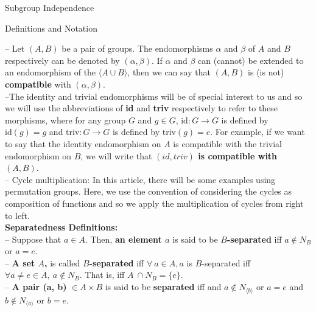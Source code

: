 \documentclass{article}
\begin{document}
\begin{section}{Subgroup Independence}
\begin{subsection}{\large Definitions and Notation}
			
			
			\noindent -- Let $(A, B)$ be a pair of groups. The endomorphisms $\alpha$ and $\beta$ of $A$ and $B$ respectively can be denoted by $(\alpha, \beta)$. If  $\alpha$ and $\beta$ can (cannot) be extended to an endomorphism of the $\langle A \cup B\rangle $, then we can say that $(A, B)$ is (is not) \textbf{compatible} with $(\alpha, \beta)$.\\
			
			\noindent --The identity and trivial endomorphisms will be of special interest to us and so we will use the abbreviations of \textbf{id} and\textbf{ triv} respectively to refer to these morphisms, where for any group $G$ and $g \in G$,  $\text{id}: G \rightarrow G$ is defined by $\text{id}(g) = g$ and $\text{triv}: G \rightarrow G$ is defined by $\text{triv}(g) = e$. For example, if we want to say that  the identity endomorphism  on $A$ is compatible with the trivial endomorphism on $B$, we will write that \textbf{$(id, triv)$ is compatible with $(A, B)$}.\\
			
			
			
			\noindent -- Cycle multiplication: In this article, there will be some examples using permutation groups. Here, we use the convention of considering the cycles as composition of functions and so we apply the multiplication of cycles from right to left.\\
			
			
			
			
			
			
			
			
			{\large\noindent \textbf{Separatedness Definitions:}}\\
			
			\noindent -- Suppose that $a  \in A$. 
			Then,  \textbf{an element $a$} is said to be \textbf{$B$-separated} iff  $a  \not\in  N_B $ or $a = e$.\\
			
			\noindent -- \textbf{A set $A$,} is called \textbf{$B$-separated }iff  $ \forall  \ a  \in A, a$ is  $B$-separated iff $ \forall  a \not= e \in A, \ a \not\in  N_B $. That is, iff $A\  \cap  N_B  = \{e\}$. \\
			
			
			\noindent -- \textbf{A pair (a, b)} $\in A \times B$  is said to be \textbf{separated} iff  and $a \not\in N_{\langle b\rangle} $ or $a = e$ and $b \not\in N_{\langle a \rangle} $ or $b = e$.\\
			

\end{subsection}
\end{section}
\end{document}
